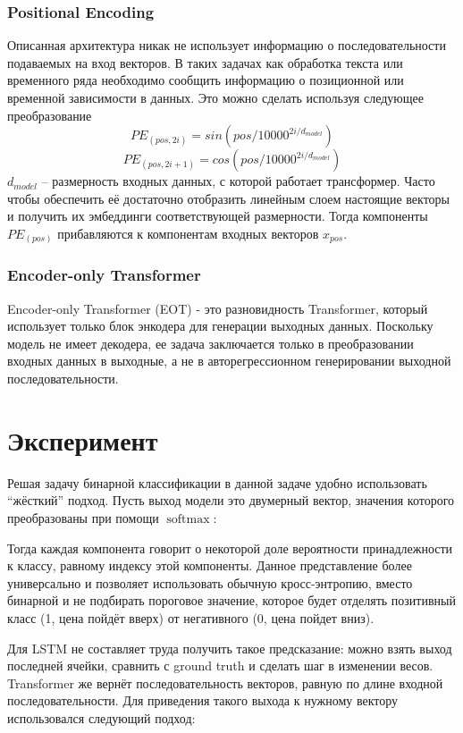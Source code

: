 \documentclass[diploma]{nanolab2015}
\DeclareMathOperator{\softmax}{softmax}
\begin{document}
\subsubsection{Positional Encoding}
Описанная архитектура никак не использует информацию о последовательности подаваемых на вход векторов. В таких задачах как обработка текста или временного ряда необходимо сообщить информацию о позиционной или временной зависимости в данных. Это можно сделать используя следующее преобразование
$$PE_{(pos,2i)} = sin(pos/10000^{2i/d_{model}})$$
$$PE_{(pos,2i+1)} = cos(pos/10000^{2i/d_{model}})$$
$d_{model}$ -- размерность входных данных, с которой работает трансформер. Часто чтобы обеспечить её достаточно отобразить линейным слоем настоящие векторы и получить их эмбеддинги соответствующей размерности. Тогда компоненты $PE_{(pos)}$ прибавляются к компонентам входных векторов $x_{pos}$.

\subsubsection{Encoder-only Transformer}
Encoder-only Transformer (EOT) - это разновидность Transformer, который использует только блок энкодера для генерации выходных данных. Поскольку модель не имеет декодера, ее задача заключается только в преобразовании входных данных в выходные, а не в авторегрессионном генерировании выходной последовательности.


\newpage
\section{Эксперимент}
Решая задачу бинарной классификации в данной задаче удобно использовать ``жёсткий'' подход. Пусть выход модели это двумерный вектор, значения которого преобразованы при помощи $\softmax$:

Тогда каждая компонента говорит о некоторой доле вероятности принадлежности к классу, равному индексу этой компоненты. Данное представление более универсально и позволяет использовать обычную кросс-энтропию, вместо бинарной и не подбирать пороговое значение, которое будет отделять позитивный класс (1, цена пойдёт вверх) от негативного (0, цена пойдет вниз).

Для LSTM не составляет труда получить такое предсказание: можно взять выход последней ячейки, сравнить с ground truth и сделать шаг в изменении весов. Transformer же вернёт последовательность векторов, равную по длине входной последовательности. Для приведения такого выхода к нужному вектору использовался следующий подход:
\end{document}
